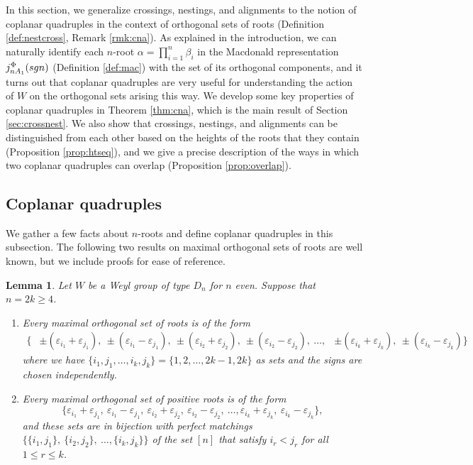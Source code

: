 \documentclass[11pt]{amsart}
\theoremstyle{plain}
\newtheorem{lemma}[theorem]{Lemma}
\theoremstyle{definition}
\theoremstyle{remark}
\numberwithin{equation}{subsection}
\newcommand{\al}{\alpha}
\newcommand{\ep}{\varepsilon}
\newcommand{\coplanar}{coplanar\xspace}
\newcommand{\macd}[2]{j^{#1}_{#2}({\rm{sgn}})}
\begin{document}
In this section, we generalize crossings, nestings, and alignments to the notion
of \coplanar quadruples in the 
context of orthogonal sets of roots (Definition \ref{def:nestcross}, Remark
\ref{rmk:cna}). 
As explained in the introduction, we can naturally identify each $n$-root $\al=\prod_{i=1}^n\beta_i$ in the
Macdonald representation $\macd{\Phi}{nA_1}$ (Definition \ref{def:mac}) with
the set of its orthogonal components, and
it turns out that \coplanar
quadruples are very useful for understanding the action of $W$ on the 
orthogonal sets arising this way. 
We develop some key properties of  \coplanar quadruples in Theorem
\ref{thm:cna}, which is the main result of Section \ref{sec:crossnest}.  We also
show that crossings, nestings, and alignments can be distinguished from each
other based on the heights of the roots that they contain (Proposition
\ref{prop:htseq}), and we give a precise description of the ways in which two
coplanar quadruples can overlap (Proposition \ref{prop:overlap}).



\subsection{Coplanar quadruples}
We gather a few facts about $n$-roots and define coplanar quadruples in this
subsection.  The following two results on maximal orthogonal sets of roots are
well known, but we include proofs for ease of reference.

\begin{lemma}\label{lem:dmax}
    Let $W$ be a Weyl group of type $D_n$ for $n$ even. Suppose that $n=2k\ge
    4$.
    \begin{enumerate}
        \item[{\rm (i)}]{Every maximal orthogonal set of roots is of the form
     \begin{align*} \{& \pm(\ep_{i_1} + \ep_{j_1}),\
             \pm(\ep_{i_1} - \ep_{j_1}),\   \pm(\ep_{i_2} +
             \ep_{j_2}),\  \pm(\ep_{i_2} - \ep_{j_2}),\
             \ldots, & \pm(\ep_{i_k} + \ep_{j_k}),\
 \pm(\ep_{i_k} - \ep_{j_k}) \}\end{align*} where we have 
 $\{i_1,j_1,\dots,i_k,j_k\}=\{1,2,\dots, 2k-1,2k\}$ as sets and
  the signs are chosen independently.}
\item[{\rm (ii)}]{Every maximal orthogonal set of positive roots is of the form
     $$ \{ \ep_{i_1} + \ep_{j_1}, \ \ep_{i_1} - \ep_{j_1}, \ \ep_{i_2} +
     \ep_{j_2}, \ \ep_{i_2} - \ep_{j_2}, \ \ldots, \ep_{i_k} + \ep_{j_k}, \
 \ep_{i_k} - \ep_{j_k} \} ,$$ and these sets are in bijection with perfect
 matchings $\{ \{i_1, j_1\}, \ \{i_2, j_2\},\ \ldots, \{i_k, j_k\}\}$ of the set
 $[n]$ that satisfy $i_r < j_r$ for all $1 \leq r \leq k$.}
\end{enumerate}
\end{lemma}
\end{document}
